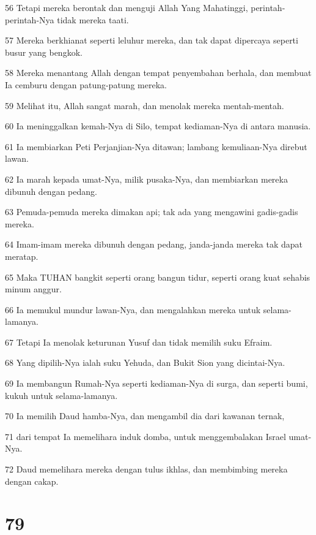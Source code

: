 \par 56 Tetapi mereka berontak dan menguji Allah Yang Mahatinggi, perintah-perintah-Nya tidak mereka taati.
\par 57 Mereka berkhianat seperti leluhur mereka, dan tak dapat dipercaya seperti busur yang bengkok.
\par 58 Mereka menantang Allah dengan tempat penyembahan berhala, dan membuat Ia cemburu dengan patung-patung mereka.
\par 59 Melihat itu, Allah sangat marah, dan menolak mereka mentah-mentah.
\par 60 Ia meninggalkan kemah-Nya di Silo, tempat kediaman-Nya di antara manusia.
\par 61 Ia membiarkan Peti Perjanjian-Nya ditawan; lambang kemuliaan-Nya direbut lawan.
\par 62 Ia marah kepada umat-Nya, milik pusaka-Nya, dan membiarkan mereka dibunuh dengan pedang.
\par 63 Pemuda-pemuda mereka dimakan api; tak ada yang mengawini gadis-gadis mereka.
\par 64 Imam-imam mereka dibunuh dengan pedang, janda-janda mereka tak dapat meratap.
\par 65 Maka TUHAN bangkit seperti orang bangun tidur, seperti orang kuat sehabis minum anggur.
\par 66 Ia memukul mundur lawan-Nya, dan mengalahkan mereka untuk selama-lamanya.
\par 67 Tetapi Ia menolak keturunan Yusuf dan tidak memilih suku Efraim.
\par 68 Yang dipilih-Nya ialah suku Yehuda, dan Bukit Sion yang dicintai-Nya.
\par 69 Ia membangun Rumah-Nya seperti kediaman-Nya di surga, dan seperti bumi, kukuh untuk selama-lamanya.
\par 70 Ia memilih Daud hamba-Nya, dan mengambil dia dari kawanan ternak,
\par 71 dari tempat Ia memelihara induk domba, untuk menggembalakan Israel umat-Nya.
\par 72 Daud memelihara mereka dengan tulus ikhlas, dan membimbing mereka dengan cakap.

\chapter{79}

